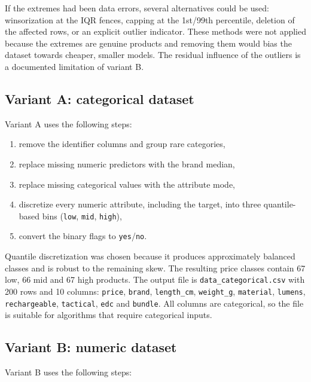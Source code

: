\documentclass[11pt,a4paper]{article}
\begin{document}
If the extremes had been data errors, several alternatives could be used:
winsorization at the IQR fences, capping at the 1st/99th percentile, deletion of
the affected rows, or an explicit outlier indicator. These methods were not
applied because the extremes are genuine products and removing them would bias
the dataset towards cheaper, smaller models. The residual influence of the
outliers is a documented limitation of variant B.

\subsection{Variant A: categorical dataset}

Variant A uses the following steps:

\begin{enumerate}
  \item remove the identifier columns and group rare categories,
  \item replace missing numeric predictors with the brand median,
  \item replace missing categorical values with the attribute mode,
  \item discretize every numeric attribute, including the target, into three
        quantile-based bins (\texttt{low}, \texttt{mid}, \texttt{high}),
  \item convert the binary flags to \texttt{yes}/\texttt{no}.
\end{enumerate}

Quantile discretization was chosen because it produces approximately balanced
classes and is robust to the remaining skew. The resulting price classes contain
67 low, 66 mid and 67 high products. The output file is
\texttt{data\_categorical.csv} with 200 rows and 10 columns:
\texttt{price}, \texttt{brand}, \texttt{length\_cm}, \texttt{weight\_g},
\texttt{material}, \texttt{lumens}, \texttt{rechargeable}, \texttt{tactical},
\texttt{edc} and \texttt{bundle}. All columns are categorical, so the file is
suitable for algorithms that require categorical inputs.

\subsection{Variant B: numeric dataset}

Variant B uses the following steps:
\end{document}
